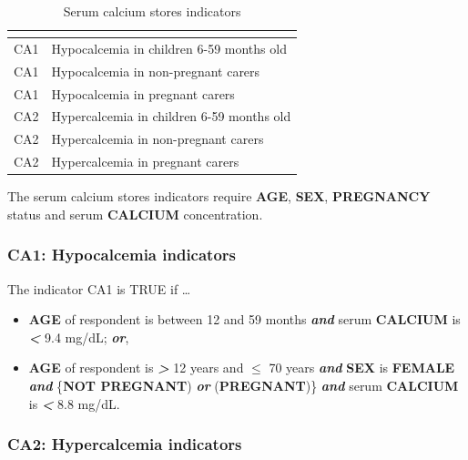 \documentclass[12pt,a4paper]{article}
\begin{document}
\begin{table}[H]

\caption{\label{tab:cal1}Serum calcium stores indicators}
\centering
\begin{tabular}[t]{ll}
\toprule
\textbf{} & \textbf{}\\
\midrule
\rowcolor{gray!6}  CA1 & Hypocalcemia in children 6-59 months old\\
CA1 & Hypocalcemia in non-pregnant carers\\
\rowcolor{gray!6}  CA1 & Hypocalcemia in pregnant carers\\
CA2 & Hypercalcemia in children 6-59 months old\\
\rowcolor{gray!6}  CA2 & Hypercalcemia in non-pregnant carers\\
\addlinespace
CA2 & Hypercalcemia in pregnant carers\\
\bottomrule
\end{tabular}
\end{table}

The serum calcium stores indicators require \textbf{AGE}, \textbf{SEX}, \textbf{PREGNANCY} status and serum \textbf{CALCIUM} concentration.

\hypertarget{ca1-hypocalcemia-indicators}{%
\subsubsection{CA1: Hypocalcemia indicators}\label{ca1-hypocalcemia-indicators}}

The indicator CA1 is TRUE if \ldots{}

\begin{itemize}
\item
  \textbf{AGE} of respondent is between 12 and 59 months \textbf{\emph{and}} serum \textbf{CALCIUM} is \textbf{\emph{\textless{}}} 9.4 mg/dL; \textbf{\emph{or}},
\item
  \textbf{AGE} of respondent is \textbf{\emph{\textgreater{}}} 12 years and \textbf{\emph{\(\leq\)}} 70 years \textbf{\emph{and}} \textbf{SEX} is \textbf{FEMALE} \textbf{\emph{and}} \{\textbf{NOT PREGNANT}) \textbf{\emph{or}} (\textbf{PREGNANT})\} \textbf{\emph{and}} serum \textbf{CALCIUM} is \textbf{\emph{\textless{}}} 8.8 mg/dL.
\end{itemize}

\hypertarget{ca2-hypercalcemia-indicators}{%
\subsubsection{CA2: Hypercalcemia indicators}\label{ca2-hypercalcemia-indicators}}
\end{document}
